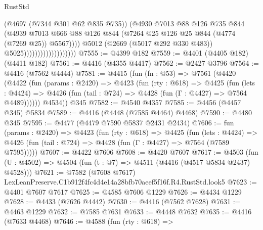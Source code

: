\begin{lexlean}{RustStd}
\begin{coremodule}
                                            (@4697 (@7344 @301 @62 @835 @735))
                                            (@4930
                                              @7013
                                              @88
                                              @126
                                              @735
                                              @844
                                              (@4939
                                                @7013
                                                @666
                                                @88
                                                @126
                                                @844
                                                (@7264
                                                  @25
                                                  @126
                                                  @25
                                                  @844
                                                  (@4774 (@7269 @25))
                                                  @5567))))
                                          @5012
                                          (@2669 (@5017 @292 @330 @483))
                                          @5025)))))))))))))))))))
@7555 := @4399 @182
@7559 := @4401 (@4405 @182) (@4411 @182)
@7561 := @4416 (@4355 @4417)
@7562 := @2427 @3796
@7564 := @4416 (@7562 @4444)
@7581 := @4415
    (fun (fn : @53) =>
    @7561
      (@4420
        (@4422
          (fun (params : @2420) =>
          @4423
            (fun (rty : @618) =>
            @4425
              (fun (lets : @4424) =>
              @4426 (fun (tail : @724) => @4428 (fun (Γ : @4427) => @7564 @4489))))))
        @4534))
    @345
@7582 := @4540 @4357
@7585 := @4456 (@4457 @345) @5834
@7589 := @4416 (@4448 (@7585 @4464) @4468)
@7590 := @4480 @345
@7595 := @4477 (@4479 @7590 @5837 @2431 @2434)
@7606 := fun (params : @2420) =>
  @4423
    (fun (rty : @618) =>
    @4425
      (fun (lets : @4424) =>
      @4426 (fun (tail : @724) => @4428 (fun (Γ : @4427) => @7564 (@7589 @7595)))))
@7607 := @4422 @7606
@7608 := @4420 @7607
@7617 := @4503 (fun (U : @4502) => @4504 (fun (t : @7) => @4511 (@4416 (@4517 @5834 @2437) @4528)))
@7621 := @7582 (@7608 @7617) LexLeanPreserve.C1b912f4fc4d4e14a28bfb70aeef5f16f.R4.RustStd.look5
@7623 := @4401 @7607 @7617
@7625 := @4585 @7606 @1229
@7626 := @4434 @1229
@7628 := @4433 (@7626 @4442)
@7630 := @4416 (@7562 @7628)
@7631 := @4463 @1229
@7632 := @7585 @7631
@7633 := @4448 @7632
@7635 := @4416 (@7633 @4468)
@7646 := @4588
    (fun (rty : @618) =>

\end{coremodule}
\end{lexlean}
